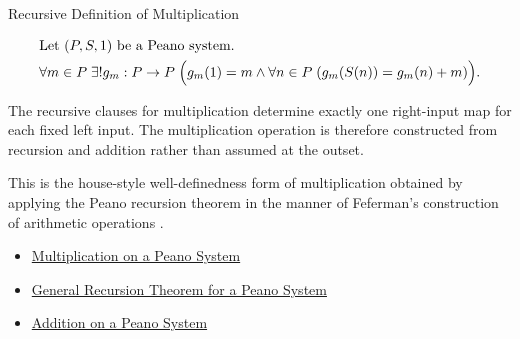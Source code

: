 \begin{topicbox}{Recursive Definition of Multiplication}
\begin{remark*}
\[
\begin{aligned}
&\text{Let } (P,S,1) \text{ be a Peano system.}\\
&\forall m \in P\;\exists! g_m : P \to P\;
\Bigl(g_m(1)=m \land
\forall n \in P\;(g_m(S(n))=g_m(n)+m)\Bigr).
\end{aligned}
\]
\end{remark*}

\begin{remark*}[Interpretation]
The recursive clauses for multiplication determine exactly one right-input map
for each fixed left input. The multiplication operation is therefore
constructed from recursion and addition rather than assumed at the outset.
\end{remark*}

\begin{remark*}
This is the house-style well-definedness form of multiplication obtained by
applying the Peano recursion theorem in the manner of Feferman's construction
of arithmetic operations \citep{FefermanNumberSystems1964}.
\end{remark*}

\begin{dependencies}
\begin{itemize}
  \item \hyperref[def:multiplication-on-peano-system]{Multiplication on a Peano System}
  \item \hyperref[thm:general-recursion-theorem-for-peano-system]{General Recursion Theorem for a Peano System}
  \item \hyperref[def:addition-on-peano-system]{Addition on a Peano System}
\end{itemize}
\end{dependencies}
\end{topicbox}

